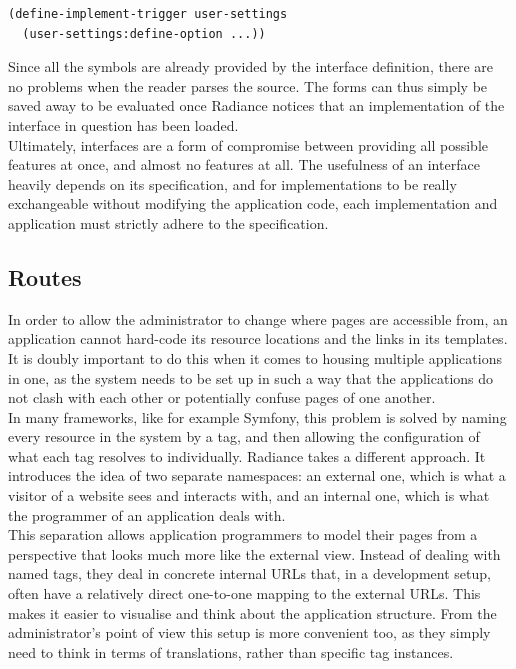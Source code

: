 \documentclass{sig-alternate}
\begin{document}
\begin{verbatim}
(define-implement-trigger user-settings
  (user-settings:define-option ...))
\end{verbatim}

Since all the symbols are already provided by the interface definition, there are no problems when the reader parses the source. The forms can thus simply be saved away to be evaluated once Radiance notices that an implementation of the interface in question has been loaded. \\

Ultimately, interfaces are a form of compromise between providing all possible features at once, and almost no features at all. The usefulness of an interface heavily depends on its specification, and for implementations to be really exchangeable without modifying the application code, each implementation and application must strictly adhere to the specification.

\subsection{Routes}
In order to allow the administrator to change where pages are accessible from, an application cannot hard-code its resource locations and the links in its templates. It is doubly important to do this when it comes to housing multiple applications in one, as the system needs to be set up in such a way that the applications do not clash with each other or potentially confuse pages of one another. \\

In many frameworks, like for example Symfony\cite{symfony}, this problem is solved by naming every resource in the system by a tag, and then allowing the configuration of what each tag resolves to individually. Radiance takes a different approach. It introduces the idea of two separate namespaces: an external one, which is what a visitor of a website sees and interacts with, and an internal one, which is what the programmer of an application deals with. \\

This separation allows application programmers to model their pages from a perspective that looks much more like the external view. Instead of dealing with named tags, they deal in concrete internal URLs that, in a development setup, often have a relatively direct one-to-one mapping to the external URLs. This makes it easier to visualise and think about the application structure. From the administrator's point of view this setup is more convenient too, as they simply need to think in terms of translations, rather than specific tag instances. \\
\end{document}
